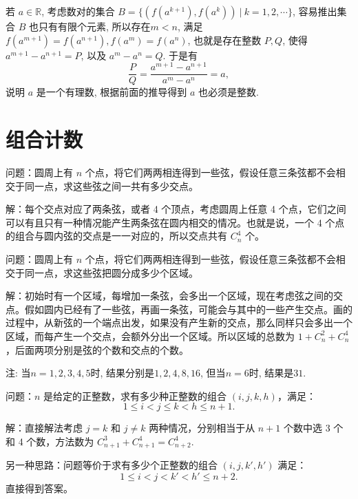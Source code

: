 若 $a \in \mathbb{R}$, 考虑数对的集合 $B =  \{ (f(a^{k+1}),f(a^k))\ |\ k = 1,2,\cdots \}$, 容易推出集合 $B$ 也只有有限个元素, 所以存在$m < n$, 满足 $f(a^{m+1}) = f(a^{n+1}), f(a^m) = f(a^n)$, 也就是存在整数 $P,Q$, 使得 $a^{m+1} - a^{n+1} = P$, 以及 $a^m - a^n = Q$. 于是有
\[\frac{P}{Q} = \frac{a^{m+1} - a^{n+1}}{a^m - a^n} = a ,\]
说明 $a$ 是一个有理数, 根据前面的推导得到 $a$ 也必须是整数.

\newpage

\section{组合计数}

问题：圆周上有 $ n $ 个点，将它们两两相连得到一些弦，假设任意三条弦都不会相交于同一点，求这些弦之间一共有多少交点。

解：每个交点对应了两条弦，或者 4 个顶点，考虑圆周上任意 4 个点，它们之间可以有且只有一种情况能产生两条弦在圆内相交的情况。也就是说，一个 4 个点的组合与圆内弦的交点是一一对应的，所以交点共有 $ C_n^4 $ 个。

\vbox{}

问题：圆周上有 $ n $ 个点，将它们两两相连得到一些弦，假设任意三条弦都不会相交于同一点，求这些弦把圆分成多少个区域。

解：初始时有一个区域，每增加一条弦，会多出一个区域，现在考虑弦之间的交点。假如圆内已经有了一些弦，再画一条弦，可能会与其中的一些产生交点。画的过程中，从新弦的一个端点出发，如果没有产生新的交点，那么同样只会多出一个区域，而每产生一个交点，会额外分出一个区域。所以区域的总数为 $ 1 + C_n^2 + C_n^4 $，后面两项分别是弦的个数和交点的个数。

注: 当$n=1,2,3,4,5$时, 结果分别是$1, 2, 4, 8, 16$, 但当$n=6$时, 结果是$31$.


\newpage


问题：$ n $ 是给定的正整数，求有多少种正整数的组合 $ (i,j,k,h) $，满足：
\[ 1\le i < j \le k < h \le n+1 .\]

解：直接解法考虑 $ j=k $ 和 $ j\neq k $ 两种情况，分别相当于从 $ n+1  $ 个数中选 3 个和 4 个数，方法数为 $ C_{n+1}^3 + C_{n+1}^4 = C_{n+2}^4 $.

另一种思路：问题等价于求有多少个正整数的组合 $ (i,j,k',h') $ 满足：
\[ 1\le i < j < k' < h' \le n+2 .\]
直接得到答案。


\vbox{}

